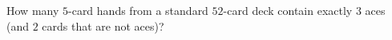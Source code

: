How many $5$-card hands from a standard $52$-card deck contain exactly $3$ aces (and $2$ cards that are not aces)?
